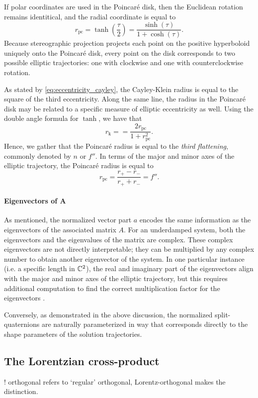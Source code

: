 If polar coordinates are used in the Poincaré disk, then the Euclidean rotation remains identitical, and the radial coordinate is equal to
\begin{equation} 
    r_\text{pc} = \tanh(\frac{\tau}{2}) = \frac{\sinh(\tau)}{1 + \cosh(\tau)}. 
\end{equation}
Because stereographic projection projects each point on the positive hyperboloid uniquely onto the Poincaré disk, every point on the disk corresponds to two possible elliptic trajectories: one with clockwise and one with counterclockwise rotation.

As stated by \cref{eq:eccentricity_cayley}, the Cayley-Klein radius is equal to the square of the third eccentricity. Along the same line, the radius in the Poincaré disk may be related to a specific measure of elliptic eccentricity as well. Using the double angle formula for $ \tanh $, we have that
$$ r_\text{k} = = \frac{2r_\text{pc}}{1 + r_\text{pc}^2}. $$
Hence, we gather that the Poincaré radius is equal to the \emph{third flattening}, commonly denoted by $n$ or $f''$. In terms of the major and minor axes of the elliptic trajectory, the Poincaré radius is equal to
$$ r_\text{pc} = \frac{r_+ - r_-}{r_+ + r_-} = f''.$$

\paragraph{Eigenvectors of A} As mentioned, the normalized vector part $a$ encodes the same information as the eigenvectors of the associated matrix $A$. For an underdamped system, both the eigenvectors and the eigenvalues of the matrix are complex. These complex eigenvectors are not directly interpretable; they can be multiplied by any complex number to obtain another eigenvector of the system. In one particular instance (i.e. a specific length in $\mathbb{C}^2$), the real and imaginary part of the eigenvectors align with the major and minor axes of the elliptic trajectory, but this requires additional computation to find the correct multiplication factor for the eigenvectors \cite{Edwards2018}. 

Conversely, as demonstrated in the above discussion, the normalized split-quaternions are naturally parameterized in way that corresponds directly to the shape parameters of the solution trajectories.

\subsection{The Lorentzian cross-product}
! orthogonal refers to `regular' orthogonal, Lorentz-orthogonal makes the distinction.

